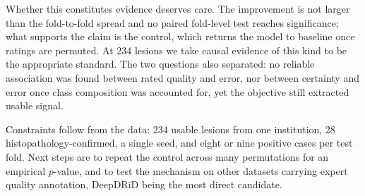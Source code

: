 \documentclass[conference]{IEEEtran}
\begin{document}
Whether this constitutes evidence deserves care. The improvement is not larger than the fold-to-fold spread and no paired fold-level test reaches significance; what supports the claim is the control, which returns the model to baseline once ratings are permuted. At 234 lesions we take causal evidence of this kind to be the appropriate standard. The two questions also separated: no reliable association was found between rated quality and error, nor between certainty and error once class composition was accounted for, yet the objective still extracted usable signal.

Constraints follow from the data: 234 usable lesions from one institution, 28 histopathology-confirmed, a single seed, and eight or nine positive cases per test fold. Next steps are to repeat the control across many permutations for an empirical $p$-value, and to test the mechanism on other datasets carrying expert quality annotation, DeepDRiD \cite{deepdrid} being the most direct candidate.
\end{document}
